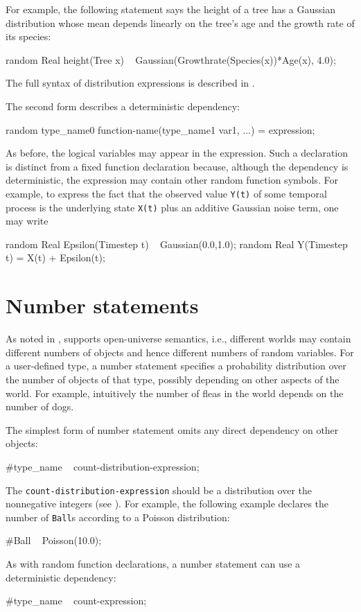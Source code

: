 \documentclass[12pt]{article}
\begin{document}
For example, the following statement says the height of a tree has a Gaussian distribution
whose mean depends linearly on the tree's age and the growth rate of its species:
\begin{blogcode}
random Real height(Tree x) ~
    Gaussian(Growthrate(Species(x))*Age(x), 4.0);
\end{blogcode}
The full syntax of distribution expressions is described in .

The second form describes a deterministic dependency:
\begin{blogcode}
random type_name0 function-name(type_name1 var1, ...) = expression;
\end{blogcode}
As before, the logical variables may appear in the expression.
Such a declaration is distinct from a fixed function declaration because, although the dependency is deterministic,
the expression may contain other random function symbols. For example, 
to express the fact that the observed value {\tt Y(t)} of some temporal process 
is the underlying state {\tt X(t)} plus an additive Gaussian noise term, one may write
\begin{blogcode}
random Real Epsilon(Timestep t) ~ Gaussian(0.0,1.0);
random Real Y(Timestep t) = X(t) + Epsilon(t);
\end{blogcode}




\section{Number statements}\label{number-section}
As noted in , \bl supports open-universe semantics, i.e., different worlds may contain different numbers of objects and hence different numbers of random variables.
For a user-defined type, a number statement specifies a probability distribution over the number of objects of that type, possibly depending
on other aspects of the world. For example, intuitively the number of fleas in the world depends on the number of dogs.

The simplest form of number statement omits any direct dependency on other objects:
\begin{blogcode}
#type_name ~ count-distribution-expression;
\end{blogcode}
The {\tt count-distribution-expression} should be a distribution over
the nonnegative integers (see ).
For example, the following example declares the number of \texttt{Ball}s according to a Poisson distribution:
\begin{blogcode}
#Ball ~ Poisson(10.0);
\end{blogcode}
As with random function declarations, a number statement can use a deterministic dependency:
\begin{blogcode}
#type_name ~ count-expression;
\end{blogcode}
\end{document}
